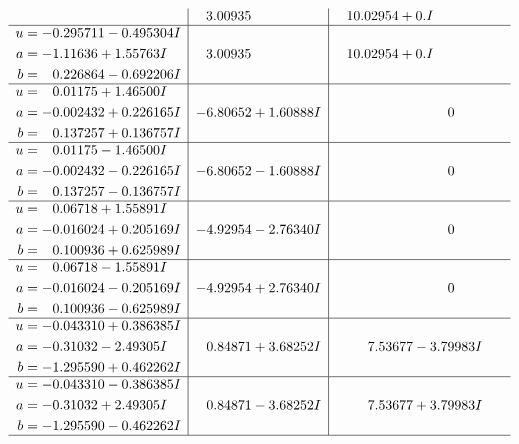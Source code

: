 \documentclass[1p]{elsarticle_modified}
\theoremstyle{definition}
\begin{document}
$$\begin{array}{c|c|c}
 & \phantom{-}3.00935\phantom{ +0.000000I} & \phantom{-}10.02954 + 0. I\phantom{ +0.000000I} \\ \hline\begin{aligned}
u &= -0.295711 - 0.495304 I \\
a &= -1.11636 + 1.55763 I \\
b &= \phantom{-}0.226864 - 0.692206 I\end{aligned}
 & \phantom{-}3.00935\phantom{ +0.000000I} & \phantom{-}10.02954 + 0. I\phantom{ +0.000000I} \\ \hline\begin{aligned}
u &= \phantom{-}0.01175 + 1.46500 I \\
a &= -0.002432 + 0.226165 I \\
b &= \phantom{-}0.137257 + 0.136757 I\end{aligned}
 & -6.80652 + 1.60888 I & \phantom{-0.000000 } 0 \\ \hline\begin{aligned}
u &= \phantom{-}0.01175 - 1.46500 I \\
a &= -0.002432 - 0.226165 I \\
b &= \phantom{-}0.137257 - 0.136757 I\end{aligned}
 & -6.80652 - 1.60888 I & \phantom{-0.000000 } 0 \\ \hline\begin{aligned}
u &= \phantom{-}0.06718 + 1.55891 I \\
a &= -0.016024 + 0.205169 I \\
b &= \phantom{-}0.100936 + 0.625989 I\end{aligned}
 & -4.92954 - 2.76340 I & \phantom{-0.000000 } 0 \\ \hline\begin{aligned}
u &= \phantom{-}0.06718 - 1.55891 I \\
a &= -0.016024 - 0.205169 I \\
b &= \phantom{-}0.100936 - 0.625989 I\end{aligned}
 & -4.92954 + 2.76340 I & \phantom{-0.000000 } 0 \\ \hline\begin{aligned}
u &= -0.043310 + 0.386385 I \\
a &= -0.31032 - 2.49305 I \\
b &= -1.295590 + 0.462262 I\end{aligned}
 & \phantom{-}0.84871 + 3.68252 I & \phantom{-}7.53677 - 3.79983 I \\ \hline\begin{aligned}
u &= -0.043310 - 0.386385 I \\
a &= -0.31032 + 2.49305 I \\
b &= -1.295590 - 0.462262 I\end{aligned}
 & \phantom{-}0.84871 - 3.68252 I & \phantom{-}7.53677 + 3.79983 I\\
 \hline 
 \end{array}$$\newpage\newpage\renewcommand{\arraystretch}{1}
\end{document}
